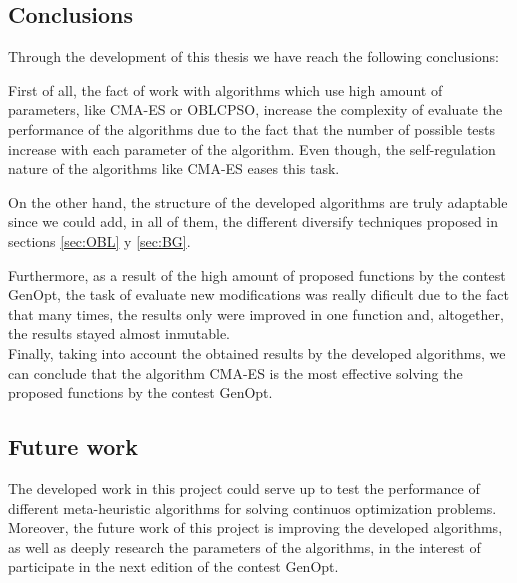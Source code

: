 
\subsection{Conclusions}

Through the development of this thesis we have reach the following conclusions: 

First of all, the fact of work with algorithms which use high amount of parameters, like CMA-ES or OBLCPSO, increase the complexity of evaluate the performance of the algorithms due to the fact that the number of possible tests increase with each parameter of the algorithm. Even though, the self-regulation nature of the algorithms like CMA-ES eases this task.

On the other hand, the structure of the developed algorithms are truly adaptable since we could add, in all of them, the different diversify techniques proposed in sections \ref{sec:OBL} y \ref{sec:BG}.

Furthermore, as a result of the high amount of proposed functions by the contest GenOpt, the task of evaluate new modifications was really dificult due to the fact that many times, the results only were improved in one function and, altogether, the results stayed almost inmutable. \\

Finally, taking into account the obtained results by the developed algorithms, we can conclude that the algorithm CMA-ES is the most effective solving the proposed functions by the contest GenOpt.



\subsection{Future work}

The developed work in this project could serve up to test the performance of different meta-heuristic algorithms for solving continuos optimization problems.\\

Moreover, the future work of this project is improving the developed algorithms, as well as deeply research the parameters of the algorithms, in the interest of participate in the next edition of the contest GenOpt.  
